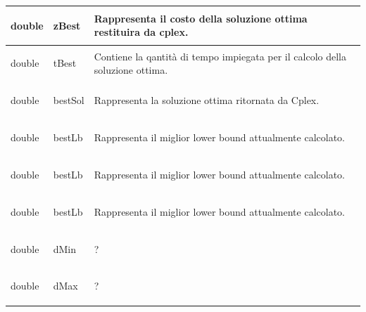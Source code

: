 \documentclass[11pt]{article}
\begin{document}
\begin{center}
\begin{longtable}{ | p{4cm} | p{4cm} | p{7cm} |}
    \begin{center} double \end{center} & \begin{center} zBest \end{center}& \vfill Rappresenta il costo della soluzione ottima restituira da cplex.\vfill \\ \hline
    \begin{center} double \end{center} & \begin{center} tBest \end{center}& \vfill Contiene la qantit\`a di tempo impiegata per il calcolo della soluzione ottima. \vfill \\ \hline
    \begin{center} double \end{center} & \begin{center} bestSol \end{center}& \vfill Rappresenta la soluzione ottima ritornata da Cplex.\vfill \\ \hline
     \begin{center} double \end{center} & \begin{center} bestLb \end{center}& \vfill Rappresenta il miglior lower bound attualmente calcolato.\vfill \\ \hline
    \begin{center} double \end{center} & \begin{center} bestLb \end{center}& \vfill Rappresenta il miglior lower bound attualmente calcolato.\vfill \\ \hline
     \begin{center} double \end{center} & \begin{center} bestLb \end{center}& \vfill Rappresenta il miglior lower bound attualmente calcolato.\vfill \\ \hline
     \begin{center} double \end{center} & \begin{center} dMin \end{center}& ?\\ \hline
     \begin{center} double \end{center} & \begin{center} dMax \end{center}& ? \\ \hline
    \end{longtable}
\end{center}
\end{document}
